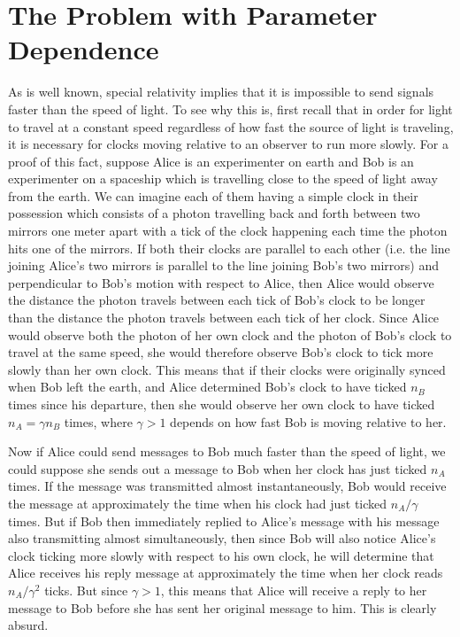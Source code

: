 \documentclass[12pt]{report}
\begin{document}

\section{The Problem with Parameter Dependence\label{PDProb}}
As is well known, special relativity implies that it is impossible to send signals faster than the speed of light. To see why this is, first recall that in order for light to travel at a constant speed regardless of how fast the source of light is traveling, it is necessary for clocks moving relative to an observer to run more slowly. For a proof of this fact, suppose Alice is an experimenter on earth and Bob is an experimenter on a spaceship which is travelling close to the speed of light away from the earth. We can imagine each of them having a simple clock in their possession which consists of a photon travelling back and forth between two mirrors one meter apart with a tick of the clock happening each time the photon hits one of the mirrors.  If both their clocks are parallel to each other (i.e. the line joining Alice's two mirrors is parallel to the line joining Bob's two mirrors) and perpendicular to Bob's motion with respect to Alice, then Alice would observe the distance the photon travels between each tick of Bob's clock to be longer than the distance the photon travels between each tick of her clock. Since Alice would observe both the photon of her own clock and the photon of Bob's clock to travel at the same speed, she would therefore observe Bob's clock to tick more slowly than her own clock. This means that if their clocks were originally synced when Bob left the earth, and Alice determined Bob's clock to have ticked $n_B$ times since his departure, then she would observe her own clock to have ticked $n_A=\gamma n_B$ times, where $\gamma >1$ depends on how fast Bob is moving relative to her.  

Now if Alice could send messages to Bob much faster than the speed of light, we could suppose she sends out a message to Bob when her clock has just ticked $n_A$ times. If the message was transmitted almost instantaneously, Bob would  receive the message at approximately the time when his clock had just ticked $n_A/\gamma$ times. 
But if Bob then immediately replied to Alice's message with his message also transmitting almost simultaneously, then since Bob will also notice Alice's clock ticking more slowly with respect to his own clock, he will determine that Alice receives his reply message at approximately the time when her clock reads $n_A/\gamma^2$ ticks. But since $\gamma>1$, this means that Alice will receive a reply to her message to Bob before she has sent her original message to him. This is clearly absurd. 
\end{document}
